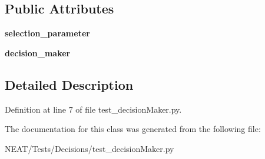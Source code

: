 \subsection*{Public Attributes}
\begin{DoxyCompactItemize}
\item 
{\bfseries selection\+\_\+parameter}\hypertarget{class_n_e_a_t___py_genetics_1_1_n_e_a_t_1_1_tests_1_1_decisions_1_1test__decision_maker_1_1_test_decision_maker_a48bf19a9ef756a110e01193d8a9e893e}{}\label{class_n_e_a_t___py_genetics_1_1_n_e_a_t_1_1_tests_1_1_decisions_1_1test__decision_maker_1_1_test_decision_maker_a48bf19a9ef756a110e01193d8a9e893e}

\item 
{\bfseries decision\+\_\+maker}\hypertarget{class_n_e_a_t___py_genetics_1_1_n_e_a_t_1_1_tests_1_1_decisions_1_1test__decision_maker_1_1_test_decision_maker_a5508e5f40a239a5ea7d682d7473a0da0}{}\label{class_n_e_a_t___py_genetics_1_1_n_e_a_t_1_1_tests_1_1_decisions_1_1test__decision_maker_1_1_test_decision_maker_a5508e5f40a239a5ea7d682d7473a0da0}

\end{DoxyCompactItemize}


\subsection{Detailed Description}


Definition at line 7 of file test\+\_\+decision\+Maker.\+py.



The documentation for this class was generated from the following file\+:\begin{DoxyCompactItemize}
\item 
N\+E\+A\+T/\+Tests/\+Decisions/test\+\_\+decision\+Maker.\+py\end{DoxyCompactItemize}
